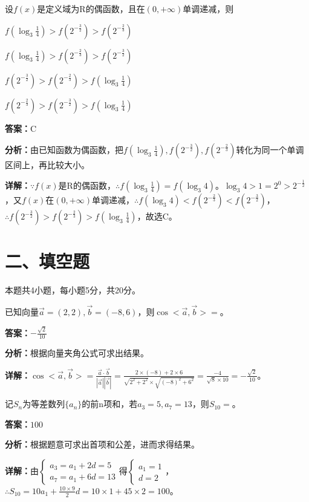 \begin{question}[points=5]
设$f(x)$是定义域为R的偶函数，且在$(0,+\infty)$单调递减，则
\begin{choices}
  \item $f(\log_3\frac{1}{4})>f(2^{-\frac{3}{2}})>f(2^{-\frac{2}{3}})$
  \item $f(\log_3\frac{1}{4})>f(2^{-\frac{2}{3}})>f(2^{-\frac{3}{2}})$
  \item $f(2^{-\frac{3}{2}})>f(2^{-\frac{2}{3}})>f(\log_3\frac{1}{4})$
  \item $f(2^{-\frac{2}{3}})>f(2^{-\frac{3}{2}})>f(\log_3\frac{1}{4})$
\end{choices}
\begin{solution}
\textbf{答案：}C

\textbf{分析：}由已知函数为偶函数，把$f(\log_3\frac{1}{4}), f(2^{-\frac{3}{2}}), f(2^{-\frac{2}{3}})$转化为同一个单调区间上，再比较大小。

\textbf{详解：}$\because f(x)$是R的偶函数，$\therefore f(\log_3\frac{1}{4})=f(\log_3 4)$。$\log_3 4>1=2^0>2^{-\frac{1}{2}}$，又$f(x)$在$(0,+\infty)$单调递减，$\therefore f(\log_3 4)<f(2^{-\frac{2}{3}})<f(2^{-\frac{3}{2}})$，$\therefore f(2^{-\frac{3}{2}})>f(2^{-\frac{2}{3}})>f(\log_3\frac{1}{4})$，故选C。
\end{solution}
\end{question}

\section*{二、填空题}
本题共4小题，每小题5分，共20分。

\begin{question}[points=5]
已知向量$\vec{a}=(2,2),\vec{b}=(-8,6)$，则$\cos<\vec{a},\vec{b}>=$。
\begin{solution}
\textbf{答案：}$-\frac{\sqrt{2}}{10}$

\textbf{分析：}根据向量夹角公式可求出结果。

\textbf{详解：}$\cos<\vec{a},\vec{b}>=\frac{\vec{a}\cdot\vec{b}}{|\vec{a}||\vec{b}|}=\frac{2\times(-8)+2\times6}{\sqrt{2^2+2^2}\times\sqrt{(-8)^2+6^2}}=\frac{-4}{\sqrt{8}\times10}=-\frac{\sqrt{2}}{10}$。
\end{solution}
\end{question}

\begin{question}[points=5]
记$S_n$为等差数列$\{a_n\}$的前n项和，若$a_3=5,a_7=13$，则$S_{10}=$。
\fillin[{$100$}]
\begin{solution}
\textbf{答案：}$100$

\textbf{分析：}根据题意可求出首项和公差，进而求得结果。

\textbf{详解：}由$\begin{cases} a_3=a_1+2d=5 \\ a_7=a_1+6d=13 \end{cases}$得$\begin{cases} a_1=1 \\ d=2 \end{cases}$，$\therefore S_{10}=10a_1+\frac{10\times9}{2}d=10\times1+45\times2=100$。
\end{solution}
\end{question}

